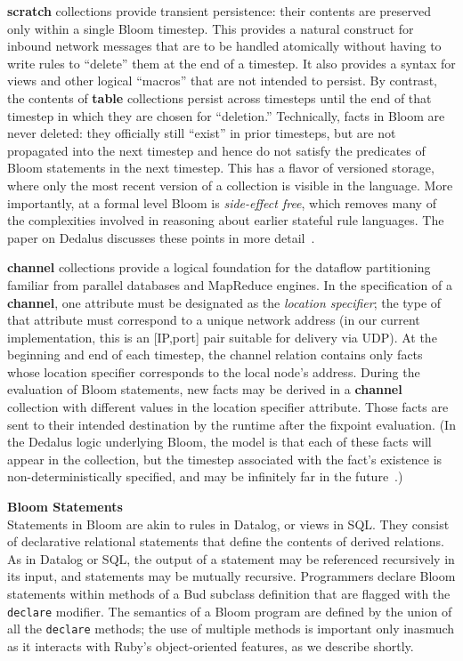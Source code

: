 {\bf scratch} collections provide transient persistence: their contents are preserved only within a single Bloom timestep.  This provides a natural construct for inbound network messages that are to be handled atomically without having to write rules to ``delete'' them at the end of a timestep.  It also provides a syntax for views and other logical ``macros'' that are not intended to persist.  By contrast, the contents of {\bf table} collections persist across timesteps until the end of that timestep in which they are chosen for ``deletion.''  Technically, facts in Bloom are never deleted: they officially still ``exist'' in prior timesteps, but are not propagated into the next timestep and hence do not satisfy the predicates of Bloom statements in the next timestep.  This has a flavor of versioned storage, where  only the most recent version of a collection is visible in the language.  More importantly, at a formal level Bloom is {\em side-effect free}, which removes many of the complexities involved in reasoning about earlier stateful rule languages.  The paper on Dedalus discusses these points in more detail~\cite{dedalus-techr}.

{\bf channel} collections provide a logical foundation for the dataflow partitioning familiar from parallel databases and MapReduce engines.  In the specification of a {\bf channel}, one attribute must be designated as the {\em location specifier}; the type of that attribute must correspond to a unique network address (in our current implementation, this is an [IP,port] pair suitable for delivery via UDP).  
At the beginning and end of each timestep, the channel relation contains only facts whose location specifier corresponds to the local node's address.  During the evaluation of Bloom statements, new facts may be derived in a {\bf channel} collection with different values in the location specifier attribute.  Those facts are sent to their intended destination by the runtime after the fixpoint evaluation.  (In the Dedalus logic underlying Bloom, the model is that each of these facts will appear in the collection, but the timestep associated with the fact's existence is non-deterministically specified, and may be infinitely far in the future~\cite{dedalus-techr}.)

{\bf Bloom Statements}\\
\noindent
Statements in Bloom are akin to rules in Datalog, or views in SQL.  They consist of declarative relational statements that define the contents of derived relations.  As in Datalog or SQL, the output of a statement may be referenced recursively in its input, and statements may be mutually recursive.  Programmers declare Bloom statements within methods of a Bud subclass definition that are flagged with the {\tt declare} modifier.  The semantics of a Bloom program are defined by the union of all the {\tt declare} methods; the use of multiple methods is important only inasmuch as it interacts with Ruby's object-oriented features, as we describe shortly.

